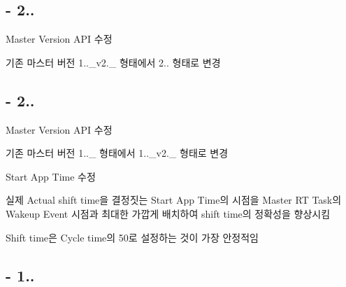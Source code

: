 \subsection*{-\/ 2..}


\begin{DoxyEnumerate}
\item Master Version A\-P\-I 수정
\begin{DoxyItemize}
\item 기존 마스터 버전 1..\-\_\-v2.\-\_ 형태에서 2.. 형태로 변경
\end{DoxyItemize}
\end{DoxyEnumerate}

\subsection*{-\/ 2..}


\begin{DoxyEnumerate}
\item Master Version A\-P\-I 수정
\begin{DoxyItemize}
\item 기존 마스터 버전 1..\-\_ 형태에서 1..\-\_\-v2.\-\_ 형태로 변경
\end{DoxyItemize}
\item Start App Time 수정
\begin{DoxyItemize}
\item 실제 Actual shift time을 결정짓는 Start App Time의 시점을 Master R\-T Task의 Wakeup Event 시점과 최대한 가깝게 배치하여 shift time의 정확성을 향상시킴
\item Shift time은 Cycle time의 50로 설정하는 것이 가장 안정적임
\end{DoxyItemize}
\end{DoxyEnumerate}

\subsection*{-\/ 1..}


